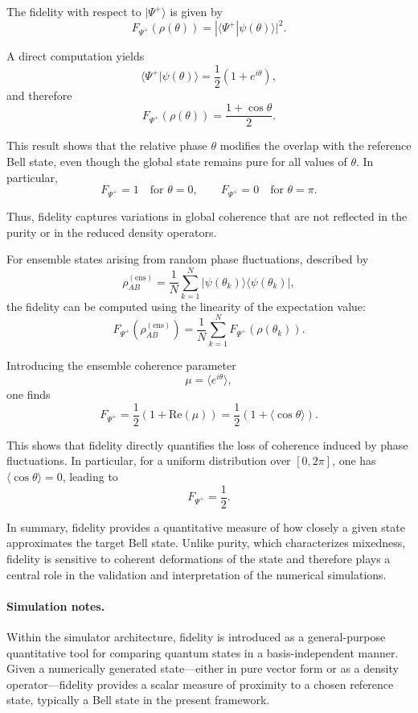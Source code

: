\documentclass[a4paper]{article}
\begin{document}
The fidelity with respect to $|\Psi^+\rangle$ is given by
\[
F_{\Psi^+}(\rho(\theta))
=
|\langle \Psi^+ | \psi(\theta) \rangle|^2.
\]

A direct computation yields
\[
\langle \Psi^+ | \psi(\theta) \rangle
=
\frac{1}{2}(1 + e^{i\theta}),
\]
and therefore
\[
F_{\Psi^+}(\rho(\theta))
=
\frac{1 + \cos\theta}{2}.
\]

\medskip

This result shows that the relative phase $\theta$ modifies the overlap with the reference Bell state, even though the global state remains pure for all values of $\theta$. In particular,
\[
F_{\Psi^+} = 1 \quad \text{for } \theta = 0,
\qquad
F_{\Psi^+} = 0 \quad \text{for } \theta = \pi.
\]

Thus, fidelity captures variations in global coherence that are not reflected in the purity or in the reduced density operators.

\medskip
For ensemble states arising from random phase fluctuations, described by
\[
\rho_{AB}^{(\mathrm{ens})}
=
\frac{1}{N}\sum_{k=1}^{N}
|\psi(\theta_k)\rangle\langle\psi(\theta_k)|,
\]
the fidelity can be computed using the linearity of the expectation value:
\[
F_{\Psi^+}(\rho_{AB}^{(\mathrm{ens})})
=
\frac{1}{N}
\sum_{k=1}^{N}
F_{\Psi^+}(\rho(\theta_k)).
\]

Introducing the ensemble coherence parameter
\[
\mu = \langle e^{i\theta} \rangle,
\]
one finds
\[
F_{\Psi^+}
=
\frac{1}{2}\left(1 + \mathrm{Re}(\mu)\right)
=
\frac{1}{2}\left(1 + \langle \cos\theta \rangle\right).
\]

\medskip

This shows that fidelity directly quantifies the loss of coherence induced by phase fluctuations. In particular, for a uniform distribution over $[0,2\pi]$, one has $\langle \cos\theta \rangle = 0$, leading to
\[
F_{\Psi^+} = \frac{1}{2}.
\]

\medskip

In summary, fidelity provides a quantitative measure of how closely a given state approximates the target Bell state. Unlike purity, which characterizes mixedness, fidelity is sensitive to coherent deformations of the state and therefore plays a central role in the validation and interpretation of the numerical simulations.

\paragraph{Simulation notes.}
Within the simulator architecture, fidelity is introduced as a general-purpose quantitative tool for comparing quantum states in a basis-independent manner. Given a numerically generated state—either in pure vector form or as a density operator—fidelity provides a scalar measure of proximity to a chosen reference state, typically a Bell state in the present framework. 
\end{document}
